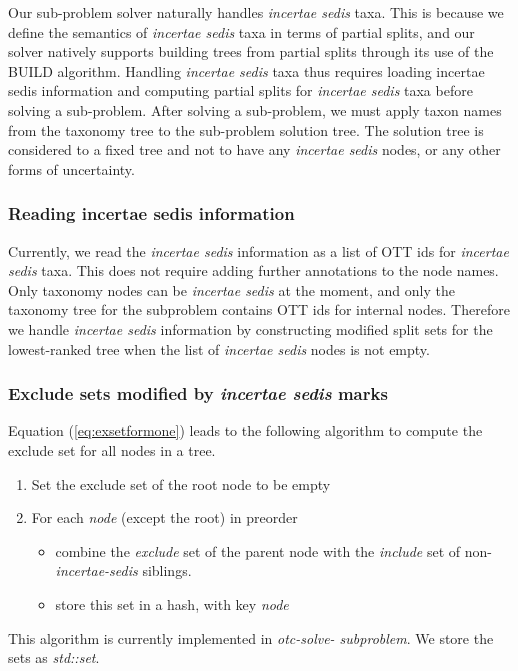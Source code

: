 \documentclass[english]{article}
\begin{document}
Our sub-problem solver naturally handles \emph{incertae sedis} taxa.
This is because we define the semantics of \emph{incertae sedis} taxa
in terms of partial splits, and our solver natively supports building
trees from partial splits through its use of the BUILD algorithm.
Handling \emph{incertae sedis} taxa thus requires loading incertae
sedis information and computing partial splits for \emph{incertae
sedis} taxa before solving a sub-problem.
After solving a sub-problem,
we must apply taxon names from the taxonomy tree to the sub-problem
solution tree.
The solution tree is considered to a fixed tree and not
to have any \emph{incertae sedis} nodes, or any other forms of
uncertainty.

\subsubsection{Reading incertae sedis information}

Currently, we read the \emph{incertae sedis} information as a list of
OTT ids for \emph{incertae sedis} taxa.
This does not require adding
further annotations to the node names.
Only taxonomy nodes can be
\emph{incertae sedis} at the moment, and only the taxonomy tree for
the subproblem contains OTT ids for internal nodes.
Therefore we
handle \emph{incertae sedis} information by constructing modified
split sets for the lowest-ranked tree when the list of \emph{incertae
sedis} nodes is not empty.

\subsubsection{Exclude sets modified by \emph{incertae sedis} marks}

Equation (\ref{eq:exsetformone}) leads to the following
algorithm to compute the exclude set for all nodes in a tree.
\begin{enumerate} \item Set the exclude set of the root node to be
empty \item For each \emph{node} (except the root) in preorder
\begin{itemize} \item combine the \emph{exclude} set of the parent
node with the \emph{include} set of non-\emph{incertae-sedis}
siblings.
\item store this set in a hash, with key \emph{node}
\end{itemize} \end{enumerate} This algorithm is currently implemented
in \emph{otc-solve- subproblem}.
We store the sets as \emph{std::set}.
\end{document}
